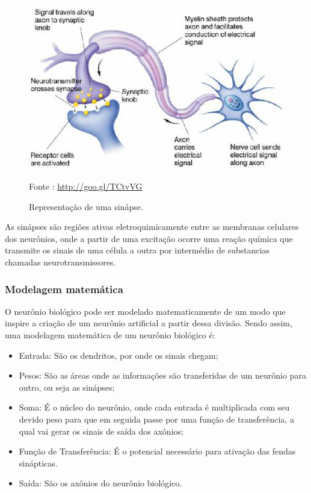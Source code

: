     \begin{figure}[ht]
        \centering
        \label{fig02}
            \includegraphics[keepaspectratio=true, scale=0.4]{editaveis/images/sinapse.eps}
        \caption{Representação de uma sinápse.}
        Fonte : \url{http://goo.gl/TCtvVG}
    \end{figure}

    As sinápses são regiões ativas eletroquimicamente entre as membranas celulares dos neurônios, onde a partir de uma excitação ocorre uma reação química que transmite os sinais de uma célula a outra por intermédio de substancias chamadas neurotransmissores.

\subsubsection{Modelagem matemática}
    O neurônio biológico pode ser modelado matematicamente de um modo que inspire a criação de um neurônio artificial a partir dessa divisão. Sendo assim, uma modelagem matemática de um neurônio biológico é: \cite{rocha2006}

    \begin{itemize}
        \item Entrada: São os dendritos, por onde os sinais chegam;
        \item Pesos: São as áreas onde as informações são transferidas de um neurônio para outro,  ou seja as sinápses;
        \item Soma: É o núcleo do neurônio, onde cada entrada é multiplicada com seu devido peso para que em seguida passe por uma função de transferência, a qual vai gerar os sinais de saída dos axônios;
        \item Função de Transferência: É o potencial necessário para ativação das fendas sinápticas.
        \item Saída: São os axônios do neurônio biológico.
    \end{itemize}

